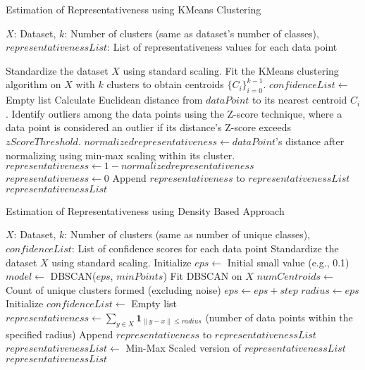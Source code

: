 \documentclass[10pt,a4paper,oneside]{article}
\begin{document}
\begin{algorithm}
\caption{Estimation of Representativeness using KMeans Clustering}
\label{alg:representativeness_kmeans}
\begin{algorithmic}[1]
\Require $X$: Dataset, $k$: Number of clusters (same as dataset's number of classes), 
\Ensure $representativenessList$: List of representativeness values for each data point

\State Standardize the dataset $X$ using standard scaling.
\State Fit the KMeans clustering algorithm on $X$ with $k$ clusters to obtain centroids $\{C_i\}_{i=0}^{k-1}$.
\State $confidenceList \gets$ Empty list
    \State Calculate Euclidean distance from $dataPoint$ to its nearest centroid $C_i$.
\EndFor
\State Identify outliers among the data points using the Z-score technique, where a data point is considered an outlier if its distance's Z-score exceeds $zScoreThreshold$.
        \State $normalizedrepresentativeness \gets dataPoint$'s distance after normalizing using min-max scaling within its cluster.
        \State $representativeness \gets 1 - normalizedrepresentativeness$
    \Else
        \State $representativeness \gets 0$
    \State Append $representativeness$ to $representativenessList$
    \EndIf
\EndFor
\State \Return $representativenessList$
\EndFunction
\end{algorithmic}
\end{algorithm}


\begin{algorithm}
\caption{Estimation of Representativeness using Density Based Approach}
\label{alg:representativeness_DBSCAN}
\begin{algorithmic}[1]
\Require $X$: Dataset, $k$: Number of clusters (same as number of unique classes), \Ensure $confidenceList$: List of confidence scores for each data point
\State Standardize the dataset $X$ using standard scaling.
\State Initialize $eps \gets$ Initial small value (e.g., 0.1)
    \State $model \gets$ DBSCAN($eps$, $minPoints$)
    \State Fit DBSCAN on $X$
    \State $numCentroids \gets$ Count of unique clusters formed (excluding noise)
    \State $eps \gets eps + step$
\EndWhile
\State $radius \gets eps$
\State Initialize $confidenceList \gets$ Empty list
    \State $representativeness \gets \sum\limits_{y \in X} \mathbf{1}_{\|y - x\| \leq radius}$ (number of data points within the specified radius)
    \State Append $representativeness$ to $representativenessList$
\EndFor
\State $representativenessList \gets$ Min-Max Scaled version of $representativenessList$ 
\State \Return $representativenessList$
\EndFunction
\end{algorithmic}
\end{algorithm}
\end{document}
